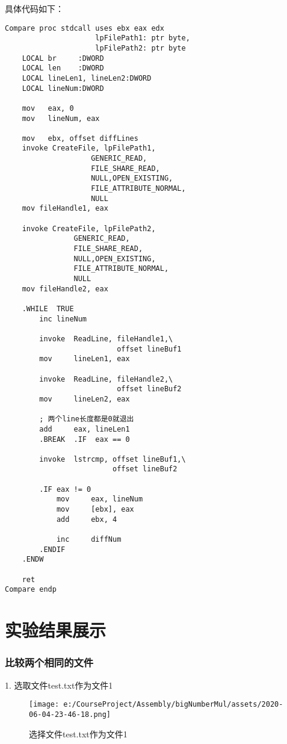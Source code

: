 具体代码如下：
\begin{lstlisting}
Compare proc stdcall uses ebx eax edx 
                     lpFilePath1: ptr byte, 
                     lpFilePath2: ptr byte
    LOCAL br     :DWORD
    LOCAL len    :DWORD
    LOCAL lineLen1, lineLen2:DWORD
    LOCAL lineNum:DWORD

    mov   eax, 0
    mov   lineNum, eax

    mov   ebx, offset diffLines
    invoke CreateFile, lpFilePath1,
                    GENERIC_READ,
                    FILE_SHARE_READ,
                    NULL,OPEN_EXISTING,
                    FILE_ATTRIBUTE_NORMAL,
                    NULL
    mov fileHandle1, eax
    
    invoke CreateFile, lpFilePath2,
                GENERIC_READ,
                FILE_SHARE_READ,
                NULL,OPEN_EXISTING,
                FILE_ATTRIBUTE_NORMAL,
                NULL
    mov fileHandle2, eax

    .WHILE  TRUE
        inc lineNum

        invoke  ReadLine, fileHandle1,\
                          offset lineBuf1
        mov     lineLen1, eax

        invoke  ReadLine, fileHandle2,\
                          offset lineBuf2
        mov     lineLen2, eax

        ; 两个line长度都是0就退出
        add     eax, lineLen1
        .BREAK  .IF  eax == 0

        invoke  lstrcmp, offset lineBuf1,\
                         offset lineBuf2

        .IF eax != 0
            mov     eax, lineNum
            mov     [ebx], eax
            add     ebx, 4

            inc     diffNum
        .ENDIF
    .ENDW

    ret
Compare endp
\end{lstlisting}

\section{实验结果展示}

\subsubsection{比较两个相同的文件}

1. 选取文件test.txt作为文件1
\begin{figure}[H]
    \centering
    \texttt{[image: e:/CourseProject/Assembly/bigNumberMul/assets/2020-06-04-23-46-18.png]}
    \caption{选择文件test.txt作为文件1}
    \label{选择文件test.txt作为文件1}
\end{figure}


